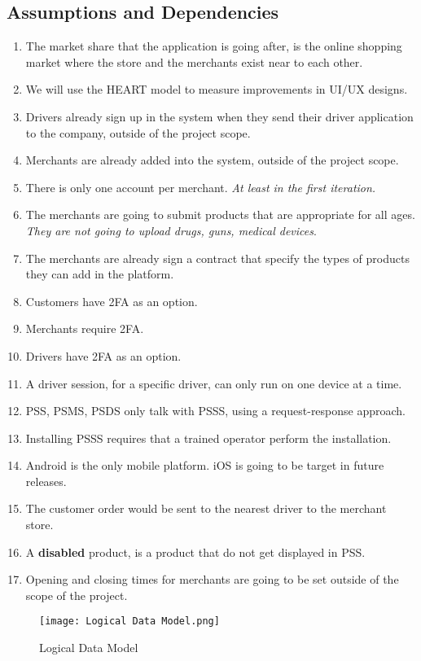 \subsection{Assumptions and Dependencies}
\begin{enumerate}[label=AS-\arabic*]
    \item The market share that the application is going after, is the online 
    shopping market where the store and the merchants exist near to each other.
    \item We will use the HEART model \cite{heart} to measure improvements 
    in UI/UX designs.
    \item Drivers already sign up in the system when they send their 
    driver application to the company, outside of the project scope.
    \item Merchants are already added into the system, outside of the 
    project scope.
    \item There is only one account per merchant. \textit{At least in the first 
    iteration.}
    \item The merchants are going to submit products that are appropriate for 
    all ages. \textit{They are not going to upload drugs, guns, medical 
    devices}.
    \item The merchants are already sign a contract that specify the types of 
    products they can add in the platform.
    \item Customers have 2FA \cite{2fa} as an option.
    \item Merchants require 2FA.
    \item Drivers have 2FA as an option.
    \item A driver session, for a specific driver, can only run on one 
    device at a time.
    \item PSS, PSMS, PSDS only talk with PSSS, using a request-response 
    approach.
    \item Installing PSSS requires that a trained operator perform 
    the installation.
    \item Android is the only mobile platform. iOS is going to be target in 
    future releases.
    \item The customer order would be sent to the nearest driver to the 
    merchant store.
    \item A \textbf{disabled} product, is a product that do not get displayed 
    in PSS.
    \item Opening and closing times for merchants are going to be set outside 
    of the scope of the project.
\end{enumerate}
\begin{figure}[!htb]
    \centering
    \texttt{[image: Logical Data Model.png]}
    \caption{Logical Data Model}
\end{figure}

